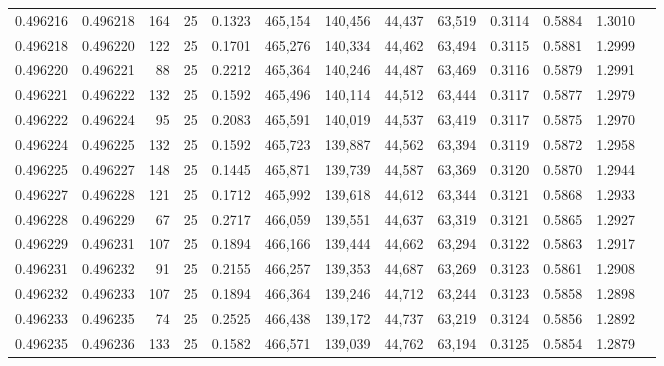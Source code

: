 \begin{tabular}{rrrrrrrrrrrrr}
0.496216 & 0.496218 &   164 &  25 &                                     0.1323 & 465,154 & 140,456 &  44,437 &  63,519 & 0.3114 & 0.5884 & 1.3010 \\
0.496218 & 0.496220 &   122 &  25 &                                     0.1701 & 465,276 & 140,334 &  44,462 &  63,494 & 0.3115 & 0.5881 & 1.2999 \\
0.496220 & 0.496221 &    88 &  25 &                                     0.2212 & 465,364 & 140,246 &  44,487 &  63,469 & 0.3116 & 0.5879 & 1.2991 \\
0.496221 & 0.496222 &   132 &  25 &                                     0.1592 & 465,496 & 140,114 &  44,512 &  63,444 & 0.3117 & 0.5877 & 1.2979 \\
0.496222 & 0.496224 &    95 &  25 &                                     0.2083 & 465,591 & 140,019 &  44,537 &  63,419 & 0.3117 & 0.5875 & 1.2970 \\
0.496224 & 0.496225 &   132 &  25 &                                     0.1592 & 465,723 & 139,887 &  44,562 &  63,394 & 0.3119 & 0.5872 & 1.2958 \\
0.496225 & 0.496227 &   148 &  25 &                                     0.1445 & 465,871 & 139,739 &  44,587 &  63,369 & 0.3120 & 0.5870 & 1.2944 \\
0.496227 & 0.496228 &   121 &  25 &                                     0.1712 & 465,992 & 139,618 &  44,612 &  63,344 & 0.3121 & 0.5868 & 1.2933 \\
0.496228 & 0.496229 &    67 &  25 &                                     0.2717 & 466,059 & 139,551 &  44,637 &  63,319 & 0.3121 & 0.5865 & 1.2927 \\
0.496229 & 0.496231 &   107 &  25 &                                     0.1894 & 466,166 & 139,444 &  44,662 &  63,294 & 0.3122 & 0.5863 & 1.2917 \\
0.496231 & 0.496232 &    91 &  25 &                                     0.2155 & 466,257 & 139,353 &  44,687 &  63,269 & 0.3123 & 0.5861 & 1.2908 \\
0.496232 & 0.496233 &   107 &  25 &                                     0.1894 & 466,364 & 139,246 &  44,712 &  63,244 & 0.3123 & 0.5858 & 1.2898 \\
0.496233 & 0.496235 &    74 &  25 &                                     0.2525 & 466,438 & 139,172 &  44,737 &  63,219 & 0.3124 & 0.5856 & 1.2892 \\
0.496235 & 0.496236 &   133 &  25 &                                     0.1582 & 466,571 & 139,039 &  44,762 &  63,194 & 0.3125 & 0.5854 & 1.2879 \\

\end{tabular}
